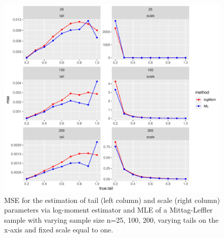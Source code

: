 \documentclass[]{elsarticle} %
\begin{document}
\begin{figure}

{\centering \includegraphics[width=0.9\linewidth]{article_springer_files/figure-latex/MSE-1} 

}

\caption{\label{fig:MSE} MSE for the estimation of tail (left column) and scale (right column) parameters via log-moment estimator and MLE of a Mittag-Leffler sample with varying sample size n=25, 100, 200, varying tails on the x-axis and fixed scale equal to one.}\label{fig:MSE}
\end{figure}
\end{document}
